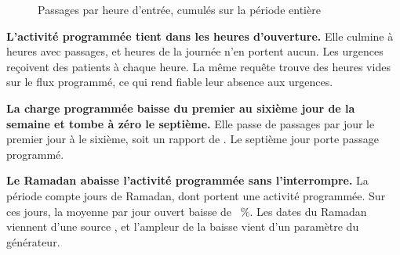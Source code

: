 \begin{figure}[htbp]
\centering
{}
\caption{Passages par heure d'entrée, cumulés sur la période entière}\label{fig:passages-heure}
\end{figure}

\textbf{L'activité programmée tient dans les heures d'ouverture.} Elle culmine à
 heures avec  passages, et
 heures de la journée n'en portent aucun. Les urgences reçoivent
des patients à chaque heure. La même requête trouve des heures vides sur le flux programmé, ce qui
rend fiable leur absence aux urgences.

\textbf{La charge programmée baisse du premier au sixième jour de la semaine et
tombe à zéro le septième.} Elle passe de  passages par jour le
premier jour à  le sixième, soit un rapport de
. Le septième jour porte 
passage programmé.

\textbf{Le Ramadan abaisse l'activité programmée sans l'interrompre.} La période
compte  jours de Ramadan, dont  portent une
activité programmée. Sur ces jours, la moyenne par jour ouvert baisse de
~\%. Les dates du Ramadan viennent d'une source \cite{s26}, et
l'ampleur de la baisse vient d'un paramètre du générateur.

